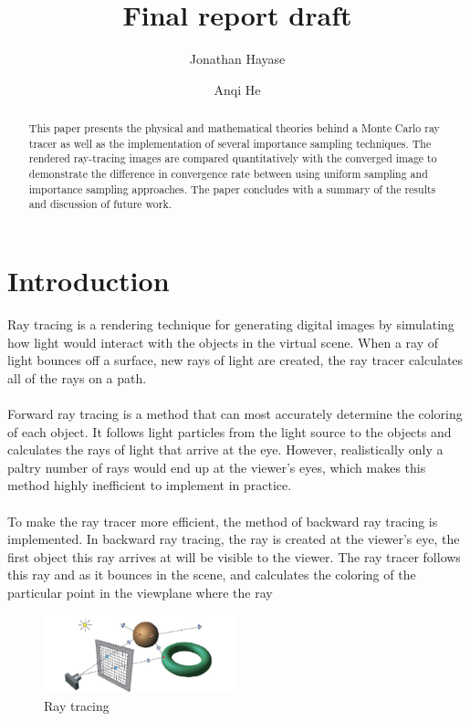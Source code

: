 \documentclass[12pt]{article}
\title{Final report draft}
\author{Jonathan Hayase\and Anqi He}
\begin{document}
\maketitle
\begin{abstract}\noindent
This paper presents the physical and mathematical theories behind a Monte Carlo ray tracer as well as the implementation of several importance sampling techniques. The rendered ray-tracing images are compared quantitatively with the converged image to demonstrate the difference in convergence rate between using uniform sampling and importance sampling approaches. The paper concludes with a summary of the results and discussion of future work.
\end{abstract}

\section{Introduction}
Ray tracing is a rendering technique for generating digital images by simulating how light would interact with the objects in the virtual scene. When a ray of light bounces off a surface, new rays of light are created, the ray tracer calculates all of the rays on a path. \\\\
Forward ray tracing is a method that can most accurately determine the coloring of each object. It follows light particles from the light source to the objects and calculates the rays of light that arrive at the eye. However, realistically only a paltry number of rays would end up at the viewer's eyes, which makes this method highly inefficient to implement in practice.\\\\
To make the ray tracer more efficient, the method of backward ray tracing is implemented. In backward ray tracing, the ray is created at the viewer's eye, the first object this ray arrives at will be visible to the viewer. The ray tracer follows this ray and as it bounces in the scene, and calculates the coloring of the particular point in the viewplane where the ray 
\begin{figure}[ht]
  \centering
    \includegraphics[width=0.5\textwidth]{figure1.png}
    \caption{Ray tracing}
\end{figure}
\end{document}
